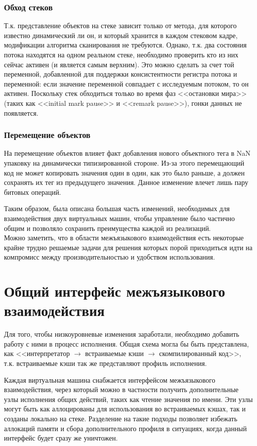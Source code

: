 \documentclass[times
]{itmo-student-thesis}
\begin{document}
\subsection{Обход стеков}
Т.к. представление объектов на стеке зависит только от метода, для которого известно динамический ли он, и который хранится в каждом стековом кадре, модификации алгоритма сканирования не требуются. Однако, т.к. два состояния потока находятся на одном реальном стеке, необходимо проверить кто из них сейчас активен (и является самым верхним). Это можно сделать за счет той переменной, добавленной для поддержки консистентности регистра потока и переменной: если значение переменной совпадает с исследуемым потоком, то он активен. Поскольку стек обходиться только во время фаз <<остановки мира>> (таких как <<initial mark pause>> и <<remark pause>>), гонки данных не появляется.
\subsection{Перемещение объектов}
На перемещение объектов влияет факт добавления нового объектного тега в NaN упаковку на динамически типизированной стороне. Из-за этого перемещающий код не может копировать значения один в один, как это было раньше, а должен сохранять их тег из предыдущего значения. Данное изменение влечет лишь пару битовых операций.


\chapterconclusion
Таким образом, была описана большая часть изменений, необходимых для взаимодействия двух виртуальных машин, чтобы управление было частично общим и позволяло сохранить преимущества каждой из реализаций.\\
Можно заметить, что в области межъязыкового взаимодействия есть некоторые крайне трудно решаемые задачи для решения которых порой приходиться идти на компромисс между производительностью и удобством использования.

\chapter{Общий интерфейс межъязыкового взаимодействия}\label{ch:architecture}
Для того, чтобы низкоуровневые изменения заработали, необходимо добавить работу с ними в процесс исполнения. Общая схема могла бы быть представлена, как <<интерпретатор $\rightarrow$ встраиваемые кэши $\rightarrow$ скомпилированный код>>, т.к. встраиваемые кэши так же представляют профиль исполнения.

Каждая виртуальная машина снабжается интерфейсом межъязыкового взаимодействия, через который можно в частности получить дополнительные узлы исполнения общих действий, таких как чтение значения по имени. Эти узлы могут быть как аллоцированы для использования во встраиваемых кэшах, так и созданы локально на стеке. Разделение на такие подходы позволяет избежать аллокаций памяти и сбора дополнительного профиля в ситуациях, когда данный интерфейс будет сразу же уничтожен.
\end{document}

